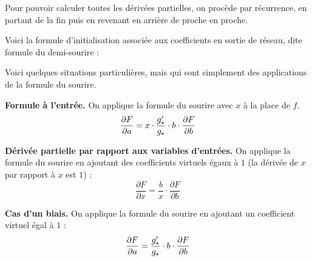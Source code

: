 Pour pouvoir calculer toutes les dérivées partielles, on procède par récurrence, en partant de la fin puis en revenant en arrière de proche en proche. 


Voici la formule d'initialisation associée aux coefficients en sortie de réseau, dite \og{}formule du demi-sourire\fg{} :


\bigskip

Voici quelques situations particulières, mais qui sont simplement des applications de la formule du sourire.

\textbf{Formule à l'entrée.} On applique la formule du sourire avec $x$ à la place de $f$.
$$\frac{\partial F}{\partial a} = x \cdot \frac{g'_\star}{g_\star} \cdot b \cdot \frac{\partial F}{\partial b}$$ 

\textbf{Dérivée partielle par rapport aux variables d'entrées.}
On applique la formule du sourire en ajoutant des coefficients virtuels égaux à $1$ (la dérivée de $x$ par rapport à $x$ est $1$) :
$$\frac{\partial F}{\partial x} = \frac{b}{x} \cdot \frac{\partial F}{\partial b}$$


\textbf{Cas d'un biais.} On applique la formule du sourire en ajoutant un coefficient virtuel égal à $1$ :
$$\frac{\partial F}{\partial a} = \frac{g'_\star}{g_\star} \cdot b \cdot \frac{\partial F}{\partial b}$$ 


